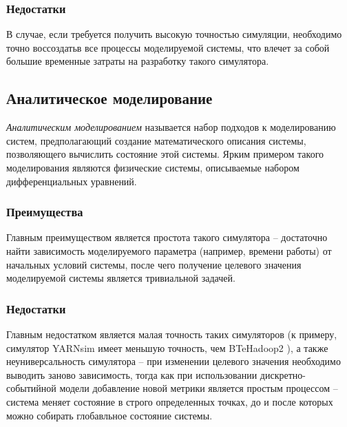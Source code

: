 \documentclass[../diploma.tex]{subfile}
\begin{document}
    \subsubsection{Недостатки}

    В случае, если требуется получить высокую точностью симуляции, необходимо
    точно воссоздатьв все процессы моделируемой системы, что влечет за собой
    большие временные затраты на разработку такого симулятора.


    \subsection{Аналитическое моделирование}
    \label{sec:simulation_methods:subsec:analytical_modeling}
    \textit{Аналитическим моделированием} называется набор подходов к
    моделированию систем, предполагающий создание математического описания
    системы, позволяющего вычислить состояние этой системы. Ярким примером
    такого моделирования являются физические системы, описываемые набором
    дифференциальных уравнений. 


    \subsubsection{Преимущества}

    Главным преимуществом является простота такого симулятора -- достаточно
    найти зависимость моделируемого параметра (например, времени работы) от
    начальных условий системы, после чего получение целевого значения
    моделируемой системы является тривиальной задачей.

    \subsubsection{Недостатки}

    Главным недостатком является малая точность таких симуляторов (к примеру,
    симулятор YARNsim \cite{yarnsim} имеет меньшую точность, чем BTeHadoop2
    \cite{baseline_model}), а также неуниверсальность симулятора -- при
    изменении целевого значения необходимо выводить заново зависимость, тогда
    как при использовании дискретно-событийной модели добавление новой метрики
    является простым процессом -- система меняет состояние в строго определенных
    точках, до и после которых можно собирать глобавльное состояние системы.
\end{document}
